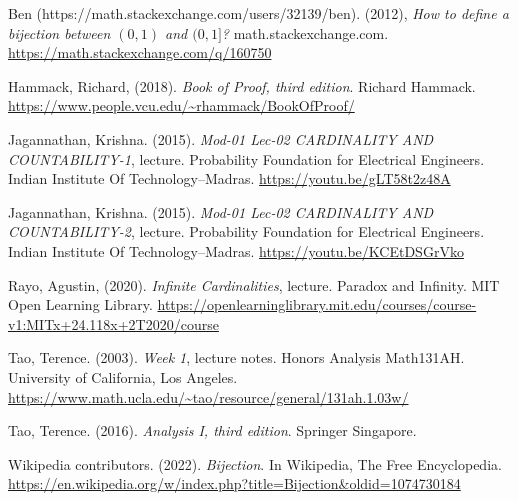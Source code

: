 \documentclass{article}[12pt]
\begin{document}
    \begin{thebibliography}{9}
        
        Ben (https://math.stackexchange.com/users/32139/ben). (2012), \emph{How to define a bijection between $(0,1)$ and $(0,1]$?} math.stackexchange.com. \url{https://math.stackexchange.com/q/160750}
        
        Hammack, Richard, (2018). \emph{Book of Proof, third edition}. Richard Hammack. \url{https://www.people.vcu.edu/~rhammack/BookOfProof/}
        
        Jagannathan, Krishna. (2015). \emph{Mod-01 Lec-02 CARDINALITY AND COUNTABILITY-1}, lecture. Probability Foundation for Electrical Engineers. Indian Institute Of Technology–Madras.
        \url{https://youtu.be/gLT58t2z48A}
        
        Jagannathan, Krishna. (2015). \emph{Mod-01 Lec-02 CARDINALITY AND COUNTABILITY-2}, lecture. Probability Foundation for Electrical Engineers. Indian Institute Of Technology–Madras.
        \url{https://youtu.be/KCEtDSGrVko}
        
        Rayo, Agustin, (2020). \emph{Infinite Cardinalities}, lecture. Paradox and Infinity. MIT Open Learning Library. \url{https://openlearninglibrary.mit.edu/courses/course-v1:MITx+24.118x+2T2020/course}
        
        Tao, Terence. (2003). \emph{Week 1}, lecture notes. Honors Analysis Math131AH. University of California, Los Angeles. \url{https://www.math.ucla.edu/~tao/resource/general/131ah.1.03w/}
        
        Tao, Terence. (2016). \emph{Analysis I, third edition}. Springer Singapore.
        
        Wikipedia contributors. (2022). \emph{Bijection}. In Wikipedia, The Free Encyclopedia. \url{https://en.wikipedia.org/w/index.php?title=Bijection&oldid=1074730184}
        
        
    \end{thebibliography}
    
    
\end{document}
